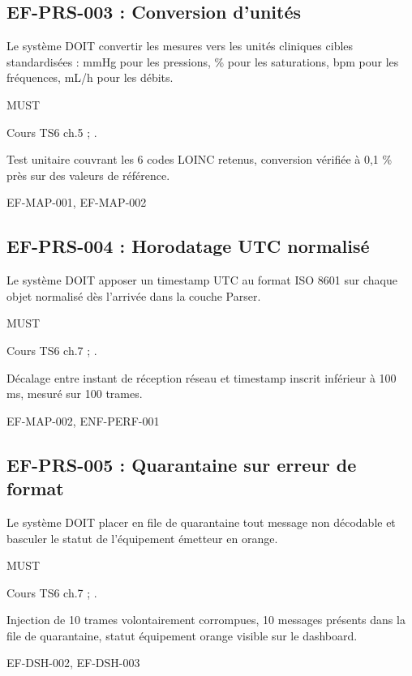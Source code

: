 \subsection*{EF-PRS-003 : Conversion d'unités}
\begin{description}[leftmargin=2.5cm, style=nextline]
  \item[Énoncé] Le système DOIT convertir les mesures vers les unités cliniques cibles standardisées : mmHg pour les pressions, \% pour les saturations, bpm pour les fréquences, mL/h pour les débits.
  \item[Priorité] MUST
  \item[Source] Cours TS6 ch.5 ; \cite{hl7_fhir_r4}.
  \item[Recette] Test unitaire couvrant les 6 codes LOINC retenus, conversion vérifiée à 0,1 \% près sur des valeurs de référence.
  \item[Lié à] EF-MAP-001, EF-MAP-002
\end{description}

\subsection*{EF-PRS-004 : Horodatage UTC normalisé}
\begin{description}[leftmargin=2.5cm, style=nextline]
  \item[Énoncé] Le système DOIT apposer un timestamp UTC au format ISO 8601 sur chaque objet normalisé dès l'arrivée dans la couche Parser.
  \item[Priorité] MUST
  \item[Source] Cours TS6 ch.7 ; \cite{hl7_fhir_r4}.
  \item[Recette] Décalage entre instant de réception réseau et timestamp inscrit inférieur à 100 ms, mesuré sur 100 trames.
  \item[Lié à] EF-MAP-002, ENF-PERF-001
\end{description}

\subsection*{EF-PRS-005 : Quarantaine sur erreur de format}
\begin{description}[leftmargin=2.5cm, style=nextline]
  \item[Énoncé] Le système DOIT placer en file de quarantaine tout message non décodable et basculer le statut de l'équipement émetteur en orange.
  \item[Priorité] MUST
  \item[Source] Cours TS6 ch.7 ; \cite{ihe_pcd_tf}.
  \item[Recette] Injection de 10 trames volontairement corrompues, 10 messages présents dans la file de quarantaine, statut équipement orange visible sur le dashboard.
  \item[Lié à] EF-DSH-002, EF-DSH-003
\end{description}

